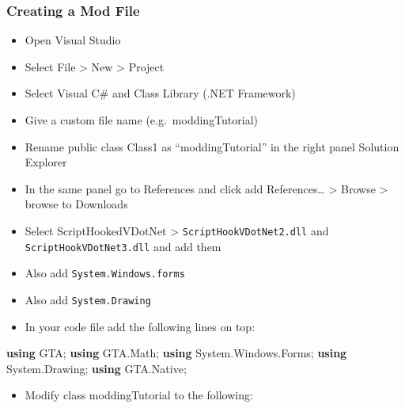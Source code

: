 \documentclass[
  openany]{book}
\newenvironment{Shaded}{\begin{snugshade}}{\end{snugshade}}
\newcommand{\FunctionTok}[1]{\textcolor[rgb]{0.00,0.00,0.00}{#1}}
\newcommand{\KeywordTok}[1]{\textcolor[rgb]{0.13,0.29,0.53}{\textbf{#1}}}
\newcommand{\NormalTok}[1]{#1}
\providecommand{\tightlist}{%
  \setlength{\itemsep}{0pt}\setlength{\parskip}{0pt}}
\begin{document}
\hypertarget{creating-a-mod-file}{%
\subsubsection*{Creating a Mod File}\label{creating-a-mod-file}}

\begin{itemize}
\item
  Open Visual Studio
\item
  Select File \textgreater{} New \textgreater{} Project
\item
  Select Visual C\# and Class Library (.NET Framework)
\item
  Give a custom file name (e.g.~moddingTutorial)
\item
  Rename public class Class1 as ``moddingTutorial'' in the right panel Solution Explorer
\item
  In the same panel go to References and click add References\ldots{} \textgreater{} Browse \textgreater{} browse to Downloads
\item
  Select ScriptHookedVDotNet \textgreater{} \texttt{ScriptHookVDotNet2.dll} and \texttt{ScriptHookVDotNet3.dll} and add them
\item
  Also add \texttt{System.Windows.forms}
\item
  Also add \texttt{System.Drawing}
\item
  In your code file add the following lines on top:
\end{itemize}

\begin{Shaded}
\begin{Highlighting}[]
\KeywordTok{using}\NormalTok{ GTA;}
\KeywordTok{using}\NormalTok{ GTA.}\FunctionTok{Math}\NormalTok{;}
\KeywordTok{using}\NormalTok{ System.}\FunctionTok{Windows}\NormalTok{.}\FunctionTok{Forms}\NormalTok{;}
\KeywordTok{using}\NormalTok{ System.}\FunctionTok{Drawing}\NormalTok{;}
\KeywordTok{using}\NormalTok{ GTA.}\FunctionTok{Native}\NormalTok{;}
\end{Highlighting}
\end{Shaded}

\begin{itemize}
\tightlist
\item
  Modify class moddingTutorial to the following:
\end{itemize}
\end{document}

